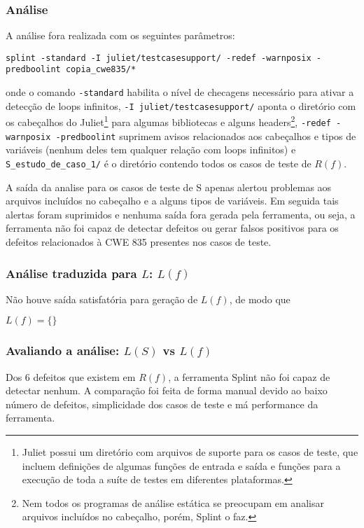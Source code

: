 \subsubsection{Análise}

A análise fora realizada com os seguintes parâmetros:

\lstinline{splint -standard -I juliet/testcasesupport/ -redef -warnposix -predboolint copia_cwe835/*}

onde o comando \lstinline{-standard} habilita o nível de checagens necessário para ativar a detecção de loops infinitos, \lstinline{-I juliet/testcasesupport/} aponta o diretório com os cabeçalhos do Juliet\footnote{Juliet possui um diretório com arquivos de suporte para os casos de teste, que incluem definições de algumas funções de entrada e saída e funções para a execução de toda a suíte de testes em diferentes plataformas.} para algumas bibliotecas e alguns headers\footnote{Nem todos os programas de análise estática se preocupam em analisar arquivos incluídos no cabeçalho, porém, Splint o faz.}, \lstinline{-redef -warnposix -predboolint} suprimem avisos relacionados aos cabeçalhos e tipos de variáveis (nenhum deles tem qualquer relação com loops infinitos) e \lstinline{S_estudo_de_caso_1/} é o diretório contendo todos os casos de teste de $R(f)$.

A saída da analise para os casos de teste de S apenas alertou problemas aos arquivos incluídos no cabeçalho e a alguns tipos de variáveis. Em seguida tais alertas foram suprimidos e nenhuma saída fora gerada pela ferramenta, ou seja, a ferramenta não foi capaz de detectar defeitos ou gerar falsos positivos para os defeitos relacionados à CWE 835 presentes nos casos de teste.

\subsubsection{Análise traduzida para $L$: $L(f)$}

Não houve saída satisfatória para geração de $L(f)$, de modo que 

$L(f) = \lbrace\rbrace$

\subsubsection{Avaliando a análise: $L(S)$ vs $L(f)$}

Dos 6 defeitos que existem em $R(f)$, a ferramenta Splint não foi capaz de detectar nenhum. A comparação foi feita de forma manual devido ao baixo número de defeitos, simplicidade dos casos de teste e má performance da ferramenta.

